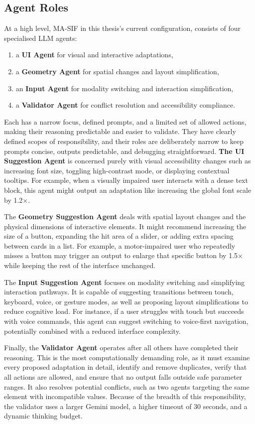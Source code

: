 \documentclass[openany]{book}
\begin{document}
\subsection{Agent Roles}
At a high level, MA-SIF in this thesis's current configuration, consists of four specialised LLM agents: 
\begin{enumerate}
    \item a \textbf{UI Agent} for visual and interactive adaptations, 
    \item a \textbf{Geometry Agent} for spatial changes and layout simplification, 
    \item an \textbf{Input Agent} for modality switching and interaction simplification, 
    \item a \textbf{Validator Agent} for conflict resolution and accessibility compliance. 
\end{enumerate}
Each has a narrow focus, defined prompts, and a limited set of allowed actions, making their reasoning predictable and easier to validate. They have clearly defined scopes of responsibility, and their roles are deliberately narrow to keep prompts concise, outputs predictable, and debugging straightforward. \textbf{The UI Suggestion Agent} is concerned purely with visual accessibility changes such as increasing font size, toggling high-contrast mode, or displaying contextual tooltips. For example, when a visually impaired user interacts with a dense text block, this agent might output an adaptation like increasing the global font scale by 1.2×.

The \textbf{Geometry Suggestion Agent} deals with spatial layout changes and the physical dimensions of interactive elements. It might recommend increasing the size of a button, expanding the hit area of a slider, or adding extra spacing between cards in a list. For example, a motor-impaired user who repeatedly misses a button may trigger an output to enlarge that specific button by 1.5× while keeping the rest of the interface unchanged.

The \textbf{Input Suggestion Agent} focuses on modality switching and simplifying interaction pathways. It is capable of suggesting transitions between touch, keyboard, voice, or gesture modes, as well as proposing layout simplifications to reduce cognitive load. For instance, if a user struggles with touch but succeeds with voice commands, this agent can suggest switching to voice-first navigation, potentially combined with a reduced interface complexity.

Finally, the \textbf{Validator Agent} operates after all others have completed their reasoning. This is the most computationally demanding role, as it must examine every proposed adaptation in detail, identify and remove duplicates, verify that all actions are allowed, and ensure that no output falls outside safe parameter ranges. It also resolves potential conflicts, such as two agents targeting the same element with incompatible values. Because of the breadth of this responsibility, the validator uses a larger Gemini model, a higher timeout of 30 seconds, and a dynamic thinking budget.
\end{document}
